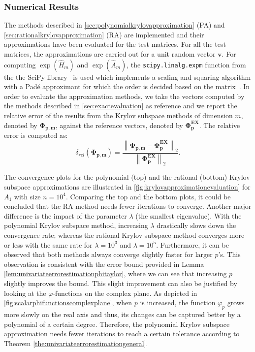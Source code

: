 \subsubsection*{Numerical Results}
The methods described in \autoref{sec:polynomialkrylovapproximation} (PA)
and \autoref{sec:rationalkrylovapproximation} (RA)
are implemented and their approximations have been evaluated for the test matrices.
For all the test matrices, the approximations are carried out for a unit
random vector $\mathbf{v}$.
For computing $\exp(\hat{H}_m)$ and $\exp(\hat{A}_m)$, the \texttt{scipy.linalg.expm}
function from the the SciPy library~\cite{SciPy2020} is used which implements a
scaling and squaring algorithm with a Padé approximant for which the order is decided
based on the matrix~\cite{almohy2010scaling}.
In order to evaluate the approximation methods, we take the vectors computed by the methods
described in \autoref{sec:exactevaluation} as reference and we report the relative
error of the results from the Krylov subspace methods of dimension $m$, denoted by
$\mathbf{\Phi_{p, m}}$, against the reference vectors, denoted by $\mathbf{\Phi_p^{EX}}$.
The relative error is computed as:
\begin{equation*}
    \delta_{rel}(\mathbf{\Phi_{p, m}}) =
    \frac{\left\| \mathbf{\Phi_{p, m}} - \mathbf{\Phi_p^{EX}} \right\|_2}
    {\left\| \mathbf{\Phi_p^{EX}} \right\|_2}.
\end{equation*}

The convergence plots for the polynomial (top) and the rational (bottom) Krylov subspace approximations are
illustrated in \autoref{fig:krylovapproximationevaluation} for $A_1$ with size $n=10^{4}$.
Comparing the top and the bottom plots, it could be concluded that the RA method needs
fewer iterations to converge.
Another major difference is the impact of the parameter $\lambda$ (the smallest eigenvalue).
With the polynomial Krylov subspace method, increasing $\lambda$ drastically slows down the convergence rate;
whereas the rational Krylov subspace method converges more or less with the same rate for
$\lambda=10^{3}$ and $\lambda=10^{5}$.
Furthermore, it can be observed that both methods always converge slightly faster for
larger $p$'s. This observation is consistent with the error bound provided in Lemma
\ref{lem:univariateerrorestimationphitaylor}, where we can see that increasing $p$ slightly
improves the bound. This slight improvement can also be justified by looking at the
$\varphi$-functions on the complex plane. As depicted in
\autoref{fig:scalarphifunctionscomplexplane}, when $p$ is increased, the
function $\varphi_p$ grows more slowly on the real axis and thus, its changes can be
captured better by a polynomial of a certain degree.
Therefore, the polynomial Krylov subspace approximation needs fewer iterations to reach a certain
tolerance according to Theorem \ref{the:univariateerrorestimationgeneral}.

